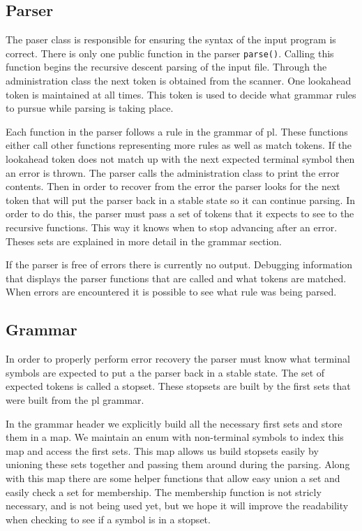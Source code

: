 \documentclass{article}
\begin{document}
\subsection{Parser}
The paser class is responsible for ensuring the syntax of the input program is correct.
There is only one public function in the parser \verb|parse()|. Calling this function begins
the recursive descent parsing of the input file. Through the administration class the next
token is obtained from the scanner. One lookahead token is maintained at all times. This token
is used to decide what grammar rules to pursue while parsing is taking place.

Each function in the parser follows a rule in the grammar
of pl. These functions either call other functions representing more rules as well as match
tokens. If the lookahead token does not match up with the next expected terminal symbol then an
error is thrown. The parser calls the administration class to print the error contents. Then in
order to recover from the error the parser looks for the next token that will put the parser back
in a stable state so it can continue parsing. In order to do this, the parser must pass a set of
tokens that it expects to see to the recursive functions. This way it knows when to stop
advancing after an error. Theses sets are explained in more detail in the grammar section.

If the parser is free of errors there is currently no output. Debugging information that displays
the parser functions that are called and what tokens are matched. When errors are encountered
it is possible to see what rule was being parsed.

\subsection{Grammar}
In order to properly perform error recovery the parser must know what terminal symbols are expected
to put a the parser back in a stable state. The set of expected tokens is called a stopset.
These stopsets are built by the first sets that were built from the pl grammar.

In the grammar header we explicitly build all the necessary first sets and store them in a map.
We maintain an enum with non-terminal symbols to index this map and access the first sets.
This map allows us build stopsets easily by unioning these sets together and passing them around during the parsing.
Along with this map there are some helper functions that allow easy union a set and easily check a set for membership.
The membership function is not stricly necessary, and is not being used yet, but we hope it will
improve the readability when checking to see if a symbol is in a stopset.
\end{document}
